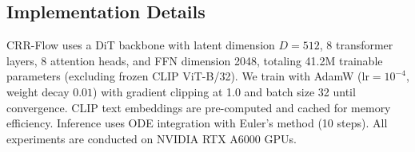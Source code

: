 \documentclass[sigconf, screen, review, anonymous]{acmart}
\begin{document}




\subsection{Implementation Details}
\label{sec:implementation}

CRR-Flow uses a DiT backbone with latent dimension $D{=}512$, 8 transformer layers, 8 attention heads, and FFN dimension 2048, totaling 41.2M trainable parameters (excluding frozen CLIP ViT-B/32).
We train with AdamW ($\text{lr}{=}10^{-4}$, weight decay $0.01$) with gradient clipping at 1.0 and batch size 32 until convergence.
CLIP text embeddings are pre-computed and cached for memory efficiency.
Inference uses ODE integration with Euler's method (10 steps).
All experiments are conducted on NVIDIA RTX A6000 GPUs.
\end{document}
